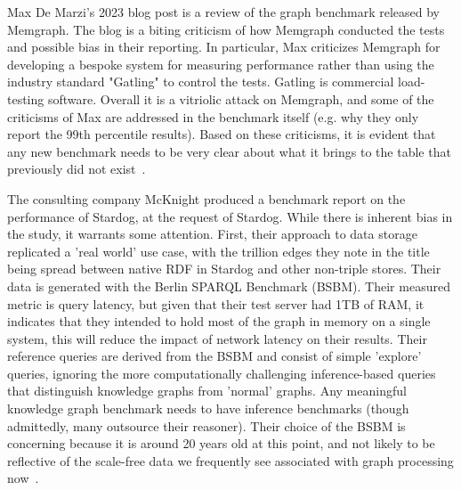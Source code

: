 \par{Max De Marzi's 2023 blog post is a review of the graph benchmark released by Memgraph. 
The blog is a biting criticism of how Memgraph conducted the tests and possible bias in their reporting. 
In particular, Max criticizes Memgraph for developing a bespoke system for measuring performance rather than using the industry standard "Gatling" to control the tests. 
Gatling is commercial load-testing software. Overall it is a vitriolic attack on Memgraph, and some of the criticisms of Max are addressed in the benchmark itself (e.g. why they only report the 99th percentile results).
Based on these criticisms, it is evident that any new benchmark needs to be very clear about what it brings to the table that previously did not exist~\cite{DeMazri2023}.}

\par{The consulting company McKnight produced a benchmark report on the performance of Stardog, at the request of Stardog. 
While there is inherent bias in the study, it warrants some attention. 
First, their approach to data storage replicated a 'real world' use case, with the trillion edges they note in the title being spread between native RDF in Stardog and other non-triple stores. 
Their data is generated with the Berlin SPARQL Benchmark (BSBM). 
Their measured metric is query latency, but given that their test server had 1TB of RAM, it indicates that they intended to hold most of the graph in memory on a single system, this will reduce the impact of network latency on their results. 
Their reference queries are derived from the BSBM and consist of simple 'explore' queries, ignoring the more computationally challenging inference-based queries that distinguish knowledge graphs from 'normal' graphs. 
Any meaningful knowledge graph benchmark needs to have inference benchmarks (though admittedly, many outsource their reasoner). 
Their choice of the BSBM is concerning because it is around 20 years old at this point, and not likely to be reflective of the scale-free data we frequently see associated with graph processing now~\cite{McKnight2021}.}


